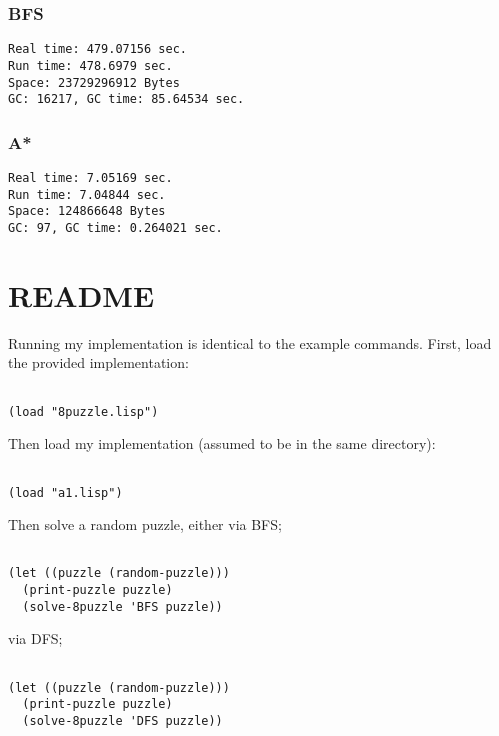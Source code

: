 \documentclass{article}
\begin{document}
\subsubsection{BFS} 
\begin{verbatim}
Real time: 479.07156 sec.
Run time: 478.6979 sec.
Space: 23729296912 Bytes
GC: 16217, GC time: 85.64534 sec.
\end{verbatim}

\subsubsection{A*} 
\begin{verbatim}
Real time: 7.05169 sec.
Run time: 7.04844 sec.
Space: 124866648 Bytes
GC: 97, GC time: 0.264021 sec.
\end{verbatim}

\section{README} 

Running my implementation is identical to the example commands. First, load the
provided implementation:

\begin{verbatim}

(load "8puzzle.lisp")

\end{verbatim}

Then load my implementation (assumed to be in the same directory):

\begin{verbatim}

(load "a1.lisp")

\end{verbatim}

Then solve a random puzzle, either via BFS;

\begin{verbatim}

(let ((puzzle (random-puzzle))) 
  (print-puzzle puzzle)
  (solve-8puzzle 'BFS puzzle))

\end{verbatim}

via DFS;

\begin{verbatim}

(let ((puzzle (random-puzzle)))
  (print-puzzle puzzle)
  (solve-8puzzle 'DFS puzzle))

\end{verbatim}
\end{document}
